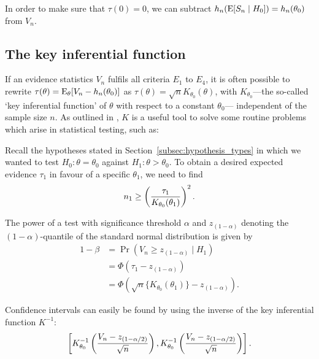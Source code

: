 In order to make sure that $\tau(0) = 0$, we can subtract ${h_n(\operatorname{\text{E}}[S_n \mid H_0]) = h_n(\theta_0)}$ from $V_n$.

\subsection{The key inferential function}
\label{subsec:kif} %
If an evidence statistics $V_n$ fulfils all criteria $E_1$ to $E_4$, it is often possible to rewrite ${\tau(\theta) = \operatorname{\text{E}}_{\theta}[V_n-h_n(\theta_0)]}$ as ${\tau(\theta) = \sqrt{n}K_{\theta_0}(\theta)}$, with $K_{\theta_0}$---the so-called `key inferential function' of $\theta$ with respect to a constant $\theta_0$--- independent of the sample size $n$. As outlined in \citet[p.~127--128]{kulinskaya_meta_2008}, $K$ is a useful tool to solve some routine problems which arise in statistical testing, such as:
\begin{description}[leftmargin=!,labelwidth=\widthof{\bfseries $E_4$}]
\item [Sample size calculation:] Recall the hypotheses stated in Section~\ref{subsec:hypothesis_types} in which we wanted to test ${H_0: \theta = \theta_0}$ against ${H_1: \theta > \theta_0}$. To obtain a desired expected evidence $\tau_1$ in favour of a specific $\theta_1$, we need to find 
\begin{align*}
n_1 \geq \left(\frac{\tau_1}{K_{\theta_0}(\theta_1)}\right)^2. \label{eq:sample_size_calculation}
\end{align*}
\item [Power calculation:] The power of a test with significance threshold $\alpha$ and $z_{(1-\alpha)}$ denoting the $(1-\alpha)$-quantile of the standard normal distribution is given by
\begin{align}
    1-\beta &= \Pr(V_n \geq z_{(1-\alpha)}\mid H_1)\\
            &= \Phi(\tau_1 - z_{(1-\alpha)})\\
            &= \Phi(\sqrt{n}\{K_{\theta_0}(\theta_1)\}-z_{(1-\alpha)}). \label{eq:power_calculation}
\end{align}
\item [Confidence intervals:] Confidence intervals can easily be found by using the inverse of the key inferential function $K^{-1}$:
\begin{align}
    \left[K_{\theta_0}^{-1}\left(\frac{V_n-z_{(1-\alpha/2)}}{\sqrt{n}}\right),K_{\theta_0}^{-1}\left(\frac{V_n-z_{(1-\alpha/2)}}{\sqrt{n}}\right)\right].\label{eq:confidence_interval_calculation}
\end{align}
\end{description}

